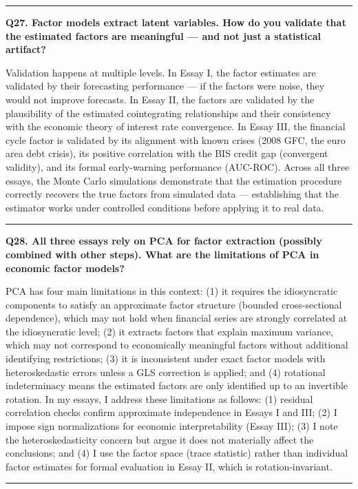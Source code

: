 \documentclass[11pt,a4paper]{article}
\begin{document}
\medskip\hrule\medskip

\textbf{Q27. Factor models extract latent variables. How do you validate that the estimated factors are meaningful — and not just a statistical artifact?}

Validation happens at multiple levels. In Essay I, the factor estimates are validated by their forecasting performance — if the factors were noise, they would not improve forecasts. In Essay II, the factors are validated by the plausibility of the estimated cointegrating relationships and their consistency with the economic theory of interest rate convergence. In Essay III, the financial cycle factor is validated by its alignment with known crises (2008 GFC, the euro area debt crisis), its positive correlation with the BIS credit gap (convergent validity), and its formal early-warning performance (AUC-ROC). Across all three essays, the Monte Carlo simulations demonstrate that the estimation procedure correctly recovers the true factors from simulated data — establishing that the estimator works under controlled conditions before applying it to real data.

\medskip\hrule\medskip

\textbf{Q28. All three essays rely on PCA for factor extraction (possibly combined with other steps). What are the limitations of PCA in economic factor models?}

PCA has four main limitations in this context: (1) it requires the idiosyncratic components to satisfy an approximate factor structure (bounded cross-sectional dependence), which may not hold when financial series are strongly correlated at the idiosyncratic level; (2) it extracts factors that explain maximum variance, which may not correspond to economically meaningful factors without additional identifying restrictions; (3) it is inconsistent under exact factor models with heteroskedastic errors unless a GLS correction is applied; and (4) rotational indeterminacy means the estimated factors are only identified up to an invertible rotation. In my essays, I address these limitations as follows: (1) residual correlation checks confirm approximate independence in Essays I and III; (2) I impose sign normalizations for economic interpretability (Essay III); (3) I note the heteroskedasticity concern but argue it does not materially affect the conclusions; and (4) I use the factor space (trace statistic) rather than individual factor estimates for formal evaluation in Essay II, which is rotation-invariant.

\medskip\hrule\medskip
\end{document}
